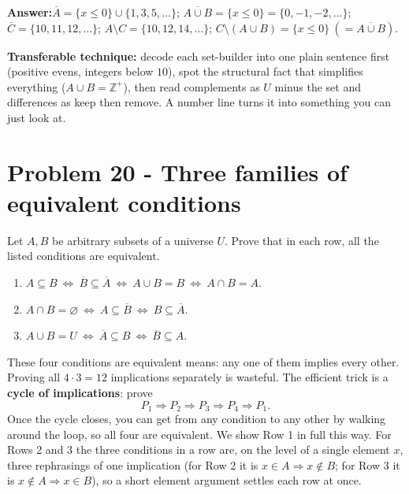 \documentclass[11pt,a4paper]{article}
\newcommand{\Z}{\mathbb{Z}}
\newcommand{\answer}[1]{\begin{answerbox}\centering\textbf{Answer:}\quad #1\end{answerbox}}
\begin{document}
\answer{$\overline{A}=\{x\le 0\}\cup\{1,3,5,\dots\}$;\quad
$\overline{A\cup B}=\{x\le 0\}=\{0,-1,-2,\dots\}$;\quad
$\overline{C}=\{10,11,12,\dots\}$;\quad
$A\setminus C=\{10,12,14,\dots\}$;\quad
$C\setminus(A\cup B)=\{x\le 0\}\ (=\overline{A\cup B})$.}

\begin{methodbox}
\textbf{Transferable technique:} decode each set-builder into one plain sentence first
(\textquotedbl{}positive evens\textquotedbl{}, \textquotedbl{}integers below $10$\textquotedbl{}),
spot the structural fact that simplifies everything ($A\cup B=\Z^{+}$), then read complements as
\textquotedbl{}$U$ minus the set\textquotedbl{} and differences as \textquotedbl{}keep then
remove\textquotedbl{}. A number line turns it into something you can just look at.
\end{methodbox}

\section*{Problem 20 - Three families of equivalent conditions}

\begin{problembox}[20]
Let $A,B$ be arbitrary subsets of a universe $U$. Prove that in each row, all the listed
conditions are equivalent.
\begin{enumerate}[label=\textbf{Row \arabic*:},leftmargin=2cm]
\item $A\subseteq B\ \Longleftrightarrow\ \overline{B}\subseteq\overline{A}\ \Longleftrightarrow\
A\cup B=B\ \Longleftrightarrow\ A\cap B=A$.
\item $A\cap B=\varnothing\ \Longleftrightarrow\ A\subseteq\overline{B}\ \Longleftrightarrow\
B\subseteq\overline{A}$.
\item $A\cup B=U\ \Longleftrightarrow\ \overline{A}\subseteq B\ \Longleftrightarrow\
\overline{B}\subseteq A$.
\end{enumerate}
\end{problembox}

\begin{ideabox}
\textquotedbl{}These four conditions are equivalent\textquotedbl{} means: any one of them implies
every other. Proving all $4\cdot 3=12$ implications separately is wasteful. The efficient trick is
a \textbf{cycle of implications}: prove
$$P_1\Rightarrow P_2\Rightarrow P_3\Rightarrow P_4\Rightarrow P_1.$$
Once the cycle closes, you can get from any condition to any other by walking around the loop, so
all four are equivalent. We show Row 1 in full this way. For Rows 2 and 3 the three conditions in a
row are, on the level of a single element $x$, three rephrasings of one implication (for Row 2 it
is \textquotedbl{}$x\in A\Rightarrow x\notin B$\textquotedbl{}; for Row 3 it is
\textquotedbl{}$x\notin A\Rightarrow x\in B$\textquotedbl{}), so a short element argument settles
each row at once.
\end{ideabox}
\end{document}
